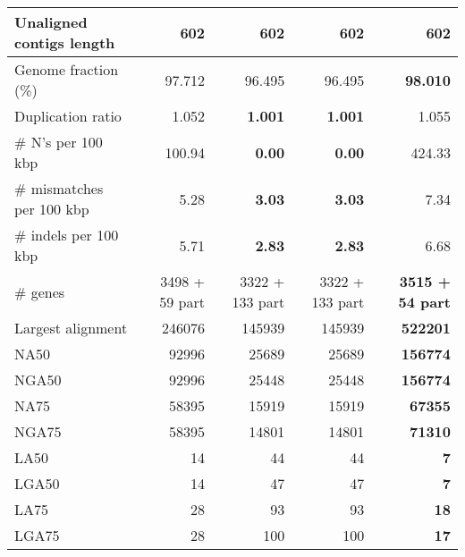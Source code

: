 \documentclass[12pt,a4paper]{article}
\begin{document}
\begin{table}[ht]
\begin{center}
\begin{tabular}{|l*{4}{|r}|}
Unaligned contigs length & 602 & 602 & 602 & 602 \\ \hline
Genome fraction (\%) & 97.712 & 96.495 & 96.495 & {\bf 98.010} \\ \hline
Duplication ratio & 1.052 & {\bf 1.001} & {\bf 1.001} & 1.055 \\ \hline
\# N's per 100 kbp & 100.94 & {\bf 0.00} & {\bf 0.00} & 424.33 \\ \hline
\# mismatches per 100 kbp & 5.28 & {\bf 3.03} & {\bf 3.03} & 7.34 \\ \hline
\# indels per 100 kbp & 5.71 & {\bf 2.83} & {\bf 2.83} & 6.68 \\ \hline
\# genes & 3498 + 59 part & 3322 + 133 part & 3322 + 133 part & {\bf 3515 + 54 part} \\ \hline
Largest alignment & 246076 & 145939 & 145939 & {\bf 522201} \\ \hline
NA50 & 92996 & 25689 & 25689 & {\bf 156774} \\ \hline
NGA50 & 92996 & 25448 & 25448 & {\bf 156774} \\ \hline
NA75 & 58395 & 15919 & 15919 & {\bf 67355} \\ \hline
NGA75 & 58395 & 14801 & 14801 & {\bf 71310} \\ \hline
LA50 & 14 & 44 & 44 & {\bf 7} \\ \hline
LGA50 & 14 & 47 & 47 & {\bf 7} \\ \hline
LA75 & 28 & 93 & 93 & {\bf 18} \\ \hline
LGA75 & 28 & 100 & 100 & {\bf 17} \\ \hline
\end{tabular}
\end{center}
\end{table}
\end{document}

